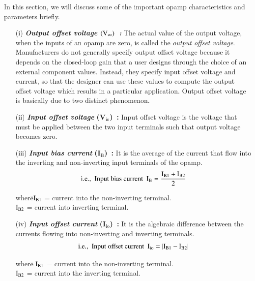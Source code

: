 In this section, we will discuss some of the important opamp characteristics and parameters briefly.
\begin{itemize}
\item[(i)] {\it\bfseries Output offset voltage \boldmath$(\textrm{V}_{\infty})$~:} The actual value of the output voltage, when the inputs of an opamp are zero, is called the {\em output offset voltage}. Manufacturers do not generally specify output offset voltage because it depends on the closed-loop gain that a user designs through the choice of an external component values. Instead, they specify input offset voltage and current, so that the designer can use these values to compute the output offset voltage which results in a particular application. Output offset voltage is basically due to two distinct phenomenon.

\item[(ii)] {\it\bfseries Input offset voltage} {\bf (V$_{\text{io}}$)~:} Input offset voltage is the voltage that must be applied between the two input terminals such that output voltage becomes zero.

\item[(iii)] {\it\bfseries Input bias current} {\bf (I$_{\text{B}}$)~:} It is the average of the current that flow into the inverting and non-inverting input terminals of the opamp.
\begin{equation}
\text{i.e.,~ Input bias current~~} \textrm{I}_{\textrm{B}}=\frac{\textrm{I}_{\textrm{B} 1}+\textrm{I}_{\textrm{B} 2}}{2}\label{eq4.2}
\end{equation}
\begin{tabbing}
where\quad \=$\textrm{I}_{\textrm{B} 1}$ = current into the non-inverting terminal.\\[3pt]
           \>$\textrm{I}_{\textrm{B} 2}$ = current into inverting terminal.
\end{tabbing}

\item[(iv)] {\it\bfseries Input offset current} {\bf (I$_{\text{io}}$)~:} It is the algebraic difference between the currents flowing into non-inverting and inverting terminals.
\begin{equation}
\text{i.e.,~ Input offset current~~} \textrm{I}_{\text{io}}=|\textrm{I}_{\text{B1}}-\textrm{I}_{\text{B2}}|\label{eq4.3}
\end{equation}
\begin{tabbing}
where\quad \= $\textrm{I}_{\text{B1}}$ = current into the non-inverting terminal.\\[3pt]
           \> $\textrm{I}_{\text{B2}}$ = current into the inverting terminal.
\end{tabbing}


\end{itemize}
